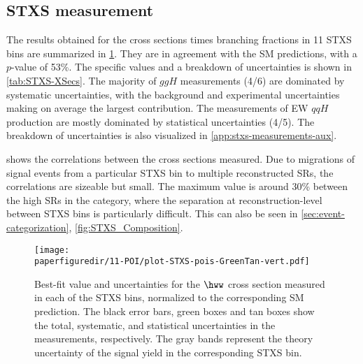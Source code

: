\subsection{STXS measurement}
The results obtained for the cross sections times branching fractions in 11 STXS bins are summarized in \cref{fig:11-POI_measurement}. 
They are in agreement with the SM predictions, with a $p$-value of 53\%.
The specific values and a breakdown of uncertainties is shown in \cref{tab:STXS-XSecs}. 
The majority of $ggH$ measurements (4/6) are dominated by systematic uncertainties, with the background and experimental uncertainties making on average the largest contribution. 
The measurements of EW $qqH$ production are mostly dominated by statistical uncertainties (4/5). 
The breakdown of uncertainties is also visualized in \cref{app:stxs-measurements-aux}. 

 shows the correlations between the cross sections measured. 
Due to migrations of signal events from a particular STXS bin to multiple reconstructed SRs, the correlations are sizeable but small. The maximum value is around 30\% between the high \pTH SRs in the \TwoJet category, where the separation at reconstruction-level between STXS bins is particularly difficult. This can also be seen in \cref{sec:event-categorization}, \cref{fig:STXS_Composition}. 

\begin{figure}[htb]
  \centering
  \texttt{[image: \\paperfiguredir/11-POI/plot-STXS-pois-GreenTan-vert.pdf]}
  \caption{
    Best-fit value and uncertainties for the $\hww$ cross section measured in each of the STXS bins, normalized to the corresponding SM prediction.
    The black error bars, green boxes and tan boxes show the total, systematic, and statistical uncertainties in the measurements, respectively.
    The gray bands represent the theory uncertainty of the signal yield in the corresponding STXS bin.
    \label{fig:11-POI_measurement}
  }
\end{figure}

